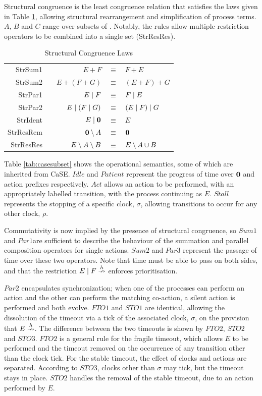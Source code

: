 Structural congruence is the least congruence relation that satisfies
the laws given in Table \ref{tab:structcong}, allowing structural
rearrangement and simplification of process terms. $A$, $B$ and $C$
range over subsets of \symbols.  Notably, the rules allow multiple
restriction operators to be combined into a single set (StrResRes).

\begin{table}
 \caption{Structural Congruence Laws}
 \label{tab:structcong}
  \shrule \centering
  \begin{tabular}{rcrcl}
  StrSum1 & \quad\quad &  
  $E + F$              & $\equiv$ & $F + E$
\\
  StrSum2 &&  
  $E + (F + G)$        & $\equiv$ & $(E + F) + G$
\\
  StrPar1 &&  
  $E \;|\; F$            & $\equiv$ & $F \;|\; E$
\\
  StrPar2 &&  
  $E \;|\; (F \;|\; G)$    & $\equiv$ & $(E \;|\; F) \;|\; G$
\\
  StrIdent &&  
  $E \;|\; \textbf{0}$         & $\equiv$ & $E$
\\
  StrResRem &&  
  $\textbf{0} \setminus {A}$       & $\equiv$ & $\textbf{0}$
\\
  StrResRes &&  
  $E \setminus {A} \setminus {B}$  & $\equiv$ & $E \setminus {A \cup B}$
  \end{tabular}
  \shrule
\end{table}

Table \ref{tab:casesubset} shows the operational semantics, some of
which are inherited from CaSE.  $Idle$ and $Patient$ represent
the progress of time over $\textbf{0}$ and action prefixes respectively.
$Act$ allows an action to be performed, with an appropriately labelled
transition, with the process continuing as $E$.  $Stall$ represents
the stopping of a specific clock, $\sigma$, allowing transitions to
occur for any other clock, $\rho$.

Commutativity is now implied by the presence of structural congruence,
so $Sum1$ and $Par1$are sufficient to describe the behaviour of the
summation and parallel composition operators for single actions.  $Sum2$
and $Par3$ represent the passage of time over these two operators.  Note
that time must be able to pass on both sides, and that the restriction
$E \mid F \stackrel{h}{\nrightarrow}$ enforces prioritisation.

$Par2$ encapsulates synchronization; when one of the processes can
perform an action and the other can perform the matching co-action, a
silent action is performed and both evolve.  $FTO1$ and $STO1$ are
identical, allowing the dissolution of the timeout via a tick of the
associated clock, $\sigma$, on the provision that $E \stackrel{h}{\nrightarrow}$.
The difference between the two timeouts is shown by $FTO2$, $STO2$ and
$STO3$.  $FTO2$ is a general rule for the fragile timeout, which allows
$E$ to be performed and the timeout removed on the occurrence of any
transition other than the clock tick.  For the stable timeout, the
effect of clocks and actions are separated.  According to $STO3$, clocks
other than $\sigma$ may tick, but the timeout stays in place.  $STO2$
handles the removal of the stable timeout, due to an action performed by
$E$.

